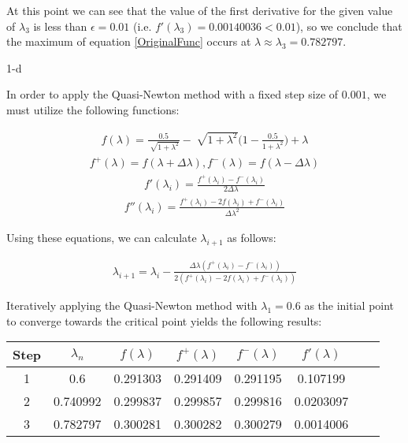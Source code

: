 \documentclass[11pt]{article}
\begin{document}
\begin{sol}
At this point we can see that the value of the first derivative for the given value of $\lambda_3$ is less than $\epsilon = 0.01$ (i.e. $f'(\lambda_3) = 0.00140036 < 0.01$), so we conclude that the maximum of equation \ref{OriginalFunc} occurs at $\lambda \approx \lambda_{3} = 0.782797$.

\end{sol}

\begin{prob}{1-d}
\end{prob}
\begin{sol} 

In order to apply the Quasi-Newton method with a fixed step size of $0.001$, we must utilize the following functions:

\begin{eqnarray}
f(\lambda) = \frac{0.5}{\sqrt[]{1 + \lambda^2}} - \sqrt[]{1 + \lambda^2}\Bigg(1 - \frac{0.5}{1 + \lambda^2}\Bigg) + \lambda
\end{eqnarray}
\begin{eqnarray*}
f^{+}(\lambda) = f(\lambda + \Delta\lambda), f^-(\lambda) = f(\lambda - \Delta\lambda)
\end{eqnarray*}
\begin{eqnarray*}
f'(\lambda_i) = \frac{f^{+}(\lambda_i) - f^{-}(\lambda_i)}{2\Delta\lambda}
\end{eqnarray*}
\begin{eqnarray*}
f''(\lambda_i) = \frac{f^{+}(\lambda_i) - 2f(\lambda_i) + f^{-}(\lambda_i)}{\Delta\lambda^2}
\end{eqnarray*}

Using these equations, we can calculate $\lambda_{i+1}$ as follows:

\begin{eqnarray*}
\lambda_{i+1} = \lambda_{i} - \frac{\Delta\lambda(f^{+}(\lambda_i) - f^{-}(\lambda_i))}{2(f^{+}(\lambda_i) - 2f(\lambda_i) + f^{-}(\lambda_i))}
\end{eqnarray*}

Iteratively applying the Quasi-Newton method with $\lambda_1 = 0.6$ as the initial point to converge towards the critical point yields the following results:

\begin{center}
  \begin{tabular}{| c | c | c | c | c | c | c | c | }
    \hline
	Step & $\lambda_{n}$ & $f(\lambda)$ & $f^{+}(\lambda)$ & $f^{-}(\lambda)$ & $f'(\lambda)$\\ \hline
	1 & 0.6 & 0.291303 & 0.291409 & 0.291195  & 0.107199\\ \hline	
	2 & 0.740992 & 0.299837 & 0.299857 & 0.299816 & 0.0203097\\ \hline
	3 & 0.782797 & 0.300281 & 0.300282 & 0.300279 & 0.0014006 \\ \hline
  \end{tabular}
\end{center}


\end{sol}
\end{document}
